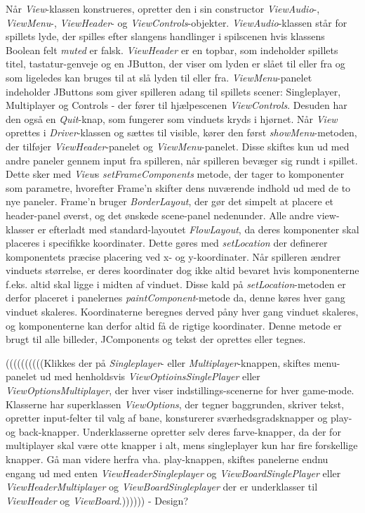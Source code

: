 Når \textit{View}-klassen konstrueres, opretter den i sin constructor \textit{ViewAudio}-, \textit{ViewMenu}-, \textit{ViewHeader}- og \textit{ViewControls}-objekter. \textit{ViewAudio}-klassen står for spillets lyde, der spilles efter slangens handlinger i spilscenen hvis klassens Boolean felt \textit{muted} er falsk. \textit{ViewHeader} er en topbar, som indeholder spillets titel, tastatur-genveje og en JButton, der viser om lyden er slået til eller fra og som ligeledes kan bruges til at slå lyden til eller fra. \textit{ViewMenu}-panelet indeholder JButtons som giver spilleren adang til spillets scener: Singleplayer, Multiplayer og Controls - der fører til hjælpescenen \textit{ViewControls}. Desuden har den også en \textit{Quit}-knap, som fungerer som vinduets kryds i hjørnet. Når \textit{View} oprettes i \textit{Driver}-klassen og sættes til visible, kører den først \textit{showMenu}-metoden, der tilføjer \textit{ViewHeader}-panelet og \textit{ViewMenu}-panelet. Disse skiftes kun ud med andre paneler gennem input fra spilleren, når spilleren bevæger sig rundt i spillet. Dette sker med \textit{View}s \textit{setFrameComponents} metode, der tager to komponenter som parametre, hvorefter Frame'n skifter dens nuværende indhold ud med de to nye paneler. Frame'n bruger \textit{BorderLayout}, der gør det simpelt at placere et header-panel øverst, og det ønskede scene-panel nedenunder. Alle andre view-klasser er efterladt med standard-layoutet \textit{FlowLayout}, da deres komponenter skal placeres i specifikke koordinater. Dette gøres med \textit{setLocation} der definerer komponentets præcise placering ved x- og y-koordinater. Når spilleren ændrer vinduets størrelse, er deres koordinater dog ikke altid bevaret hvis komponenterne f.eks. altid skal ligge i midten af vinduet. Disse kald på \textit{setLocation}-metoden er derfor placeret i panelernes \textit{paintComponent}-metode da, denne køres hver gang vinduet skaleres. Koordinaterne beregnes derved påny hver gang vinduet skaleres, og komponenterne kan derfor altid få de rigtige koordinater. Denne metode er brugt til alle billeder, JComponents og tekst der oprettes eller tegnes.

((((((((((Klikkes der på \textit{Singleplayer}- eller \textit{Multiplayer}-knappen, skiftes menu-panelet ud med henholdsvis \textit{ViewOptioinsSinglePlayer} eller \textit{ViewOptionsMultiplayer}, der hver viser indstillings-scenerne for hver game-mode. Klasserne har superklassen \textit{ViewOptions}, der tegner baggrunden, skriver tekst, opretter input-felter til valg af bane, konsturerer sværhedsgradsknapper og play- og back-knapper. Underklasserne opretter selv deres farve-knapper, da der for multiplayer skal være otte knapper i alt, mens singleplayer kun har fire forskellige knapper. Gå man videre herfra vha. play-knappen, skiftes panelerne endnu engang ud med enten \textit{ViewHeaderSingleplayer} og \textit{ViewBoardSinglePlayer} eller \textit{ViewHeaderMultiplayer} og \textit{ViewBoardSingleplayer} der er underklasser til \textit{ViewHeader} og \textit{ViewBoard}.)))))) - Design?


